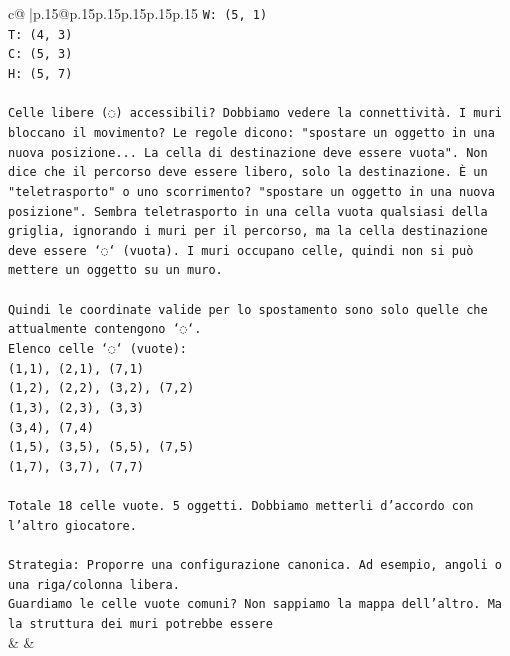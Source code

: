 \documentclass{article}
\begin{document}
{\begin{supertabular}{c@{$\;$}|p{.15\linewidth}@{}p{.15\linewidth}p{.15\linewidth}p{.15\linewidth}p{.15\linewidth}p{.15\linewidth}}
{{{\texttt{W: (5, 1)} \\
\texttt{T: (4, 3)} \\
\texttt{C: (5, 3)} \\
\texttt{H: (5, 7)} \\
\\ 
\texttt{Celle libere (◌) accessibili? Dobbiamo vedere la connettività. I muri bloccano il movimento? Le regole dicono: "spostare un oggetto in una nuova posizione... La cella di destinazione deve essere vuota". Non dice che il percorso deve essere libero, solo la destinazione. È un "teletrasporto" o uno scorrimento? "spostare un oggetto in una nuova posizione". Sembra teletrasporto in una cella vuota qualsiasi della griglia, ignorando i muri per il percorso, ma la cella destinazione deve essere `◌` (vuota). I muri occupano celle, quindi non si può mettere un oggetto su un muro.} \\
\\ 
\texttt{Quindi le coordinate valide per lo spostamento sono solo quelle che attualmente contengono `◌`.} \\
\texttt{Elenco celle `◌` (vuote):} \\
\texttt{(1,1), (2,1), (7,1)} \\
\texttt{(1,2), (2,2), (3,2), (7,2)} \\
\texttt{(1,3), (2,3), (3,3)} \\
\texttt{(3,4), (7,4)} \\
\texttt{(1,5), (3,5), (5,5), (7,5)} \\
\texttt{(1,7), (3,7), (7,7)} \\
\\ 
\texttt{Totale 18 celle vuote. 5 oggetti. Dobbiamo metterli d'accordo con l'altro giocatore.} \\
\\ 
\texttt{Strategia: Proporre una configurazione canonica. Ad esempio, angoli o una riga/colonna libera.} \\
\texttt{Guardiamo le celle vuote comuni? Non sappiamo la mappa dell'altro. Ma la struttura dei muri potrebbe essere} \\
            }
        }
    }
    & & \\ \\


\end{supertabular}}
\end{document}
